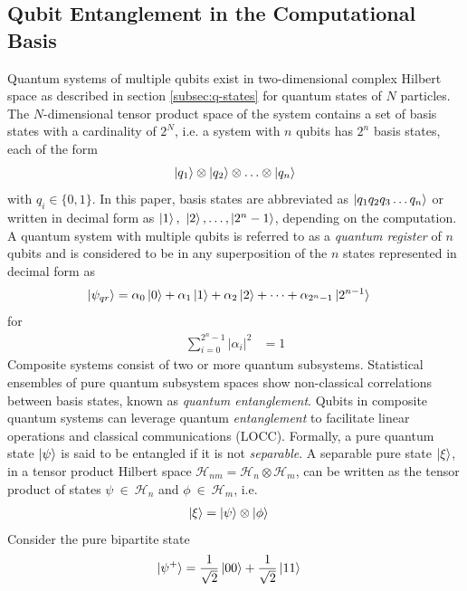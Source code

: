 \subsection{Qubit Entanglement in the Computational Basis\label{subsec:qubit-entanglement}}
Quantum systems of multiple qubits exist in two-dimensional complex Hilbert space as described in section \ref{subsec:q-states} for quantum states of $N$ particles. The $N$-dimensional tensor product space of the system contains a set of basis states with a cardinality of $2^{N}$, i.e. a system with $n$ qubits has $2^n$ basis states, each of the form
\begin{align}
	\ket{q_1}\otimes\ket{q_2}\otimes\hdots\otimes\ket{q_n}
\end{align} 
with $q_i\in \{0,1\}$. In this paper, basis states are abbreviated as $\ket{q_1 q_2 q_3 \hdots q_n}$ or written in decimal form as $\ket{1}, ~\ket{2}, \hdots, \ket{2^n -1}$, depending on the computation. A quantum system with multiple qubits is referred to as a \textit{quantum register} of $n$ qubits and is considered to be in any superposition of the $n$ states represented in decimal form as
\begin{align}\label{eqn:multiple-qubit-state}
	\ket{\psi_{qr}} & = \alpha_{0}\ket{0} + \alpha_{1}\ket{1} + \alpha_2 \ket{2} + \cdots + \alpha_{2^n - 1}\ket{2^{n-1}}
\end{align}  
for
\begin{align}
	 \sum_{i=0}^{2^n - 1} |\alpha_i|^2 & = 1 	
\end{align}
Composite systems consist of two or more quantum subsystems. Statistical ensembles of pure quantum subsystem spaces show non-classical correlations between basis states, known as \textit{quantum entanglement}.  Qubits in composite quantum systems can leverage quantum \textit{entanglement} to facilitate linear operations and classical communications (LOCC). Formally, a pure quantum state $\ket{\psi}$ is said to be entangled if it is not \textit{separable}. A separable pure state $\ket{\xi}$, in a tensor product Hilbert space $\mathcal{H}_{nm} = \mathcal{H}_n \otimes \mathcal{H}_m$, can be written as the tensor product of states $\psi~\in~\mathcal{H}_n$ and $\phi~\in~\mathcal{H}_m$, i.e.
\begin{align}
	\ket{\xi}	& = \ket{\psi}\otimes\ket{\phi}
\end{align}
Consider the pure bipartite state
\begin{align}
	\ket{\psi^+}	& = \frac{1}{\sqrt{2}}\ket{00}+\frac{1}{\sqrt{2}}\ket{11}
\end{align}
